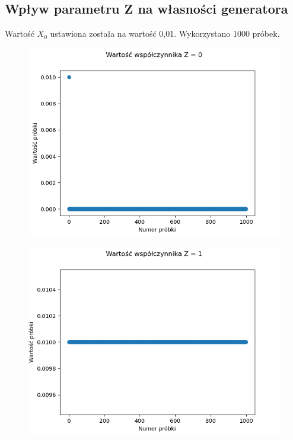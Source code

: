 \documentclass[12pt,a4paper]{article}
\begin{document}
  \subsection{Wpływ parametru Z na własności generatora}

  Wartość $X_0$ ustawiona została na wartość 0,01. Wykorzystano 1000 próbek.

  \begin{figure}[H]
    \centering
    \includegraphics[height=0.3\textheight]{figures/Figure_6.png}
    \label{fig:6}
  \end{figure}

  \begin{figure}[H]
    \centering
    \includegraphics[height=0.3\textheight]{figures/Figure_7.png}
    \label{fig:7}
  \end{figure}
\end{document}
